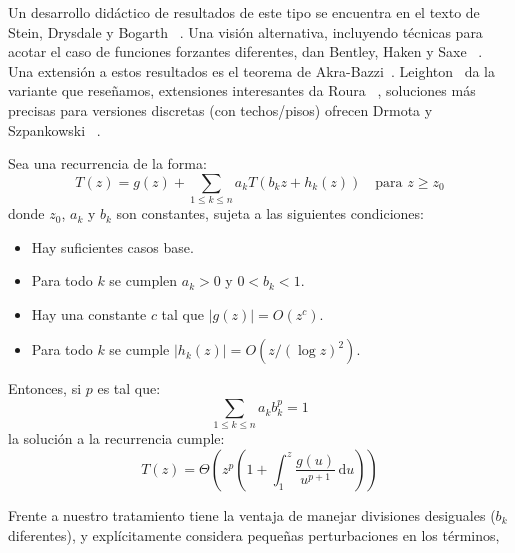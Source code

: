   Un desarrollo didáctico de resultados de este tipo
  se encuentra en el texto de Stein, Drysdale y Bogarth~%
    \cite[apéndice A]{stein10:_discr_mathem_comput_scien}.
  Una visión alternativa,
  incluyendo técnicas
  para acotar el caso de funciones forzantes diferentes,
  dan Bentley, Haken y Saxe~%
    \cite{bentley80:_gener_method_solvin_divid_conquer_recur}.
  Una extensión a estos resultados
  es el teorema de Akra-Bazzi~\cite{akra98:_sol_lin_recurr_eqs}.
  Leighton~\cite{leighton96:_notes_better_master_theo}
  da la variante que reseñamos,
  extensiones interesantes da Roura~%
     \cite{roura01:_improv_master_theor_divid_conquer_recur},
  soluciones más precisas para versiones discretas
  (con techos/pisos)
  ofrecen Drmota y Szpankowski~%
     \cite{Drmota:2011:MTD:2133036.2133064}.
  \begin{theorem}
    \label{theo:Akra-Bazzi}
    Sea una recurrencia de la forma:
    \begin{equation*}
      T(z)
	= g(z) + \sum_{1 \le k \le n} a_k T(b_k z + h_k(z))
	   \quad \text{para \(z \ge z_0\)}
    \end{equation*}
    donde \(z_0\), \(a_k\) y \(b_k\) son constantes,
    sujeta a las siguientes condiciones:
    \begin{itemize}
    \item
      Hay suficientes casos base.
    \item
      Para todo \(k\) se cumplen \(a_k > 0\) y \(0 < b_k < 1\).
    \item
      Hay una constante \(c\)
      tal que \(\lvert g(z) \rvert = O(z^c)\).
    \item
      Para todo \(k\)
      se cumple \(\lvert h_k(z) \rvert = O(z / (\log z)^2)\).
    \end{itemize}
    Entonces,
    si \(p\) es tal que:
    \begin{equation*}
      \sum_{1 \le k \le n} a_k b_k^p
	= 1
    \end{equation*}
    la solución a la recurrencia cumple:
    \begin{equation*}
      T(z)
	= \Theta
	    \left(
	      z^p \left(
		     1 + \int_1^z \frac{g(u)}{u^{p + 1}}
			   \, \mathrm{d} u
		  \right)
	    \right)
    \end{equation*}
  \end{theorem}
  Frente a nuestro tratamiento tiene la ventaja
  de manejar divisiones desiguales
  (\(b_k\) diferentes),
  y explícitamente
  considera pequeñas perturbaciones en los términos,
